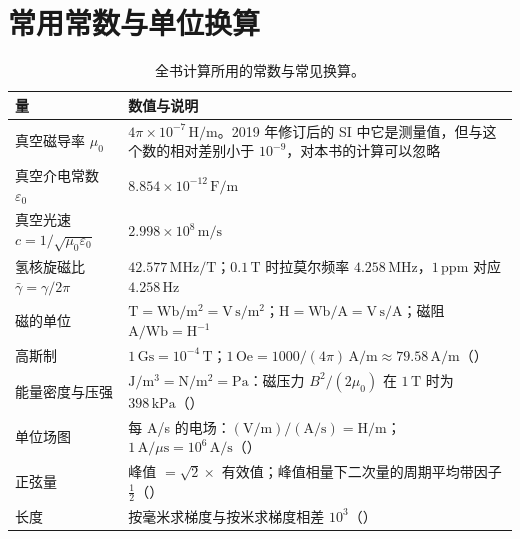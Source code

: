 \section{常用常数与单位换算}\label{sec:app-constants}

\begin{table}[H]\centering\small
\caption{全书计算所用的常数与常见换算。}\label{tab:app-constants}
\begin{tabularx}{\linewidth}{@{}>{\raggedright\arraybackslash}p{.36\linewidth} Y@{}}
\toprule
量 & 数值与说明\\\midrule
真空磁导率 $\mu_0$ & $4\pi\times10^{-7}\,\mathrm{H/m}$。2019 年修订后的 SI 中它是测量值，但与这个数的相对差别小于 $10^{-9}$，对本书的计算可以忽略\\
真空介电常数 $\varepsilon_0$ & $8.854\times10^{-12}\,\mathrm{F/m}$\\
真空光速 $c=1/\sqrt{\mu_0\varepsilon_0}$ & $2.998\times10^8\,\mathrm{m/s}$\\
氢核旋磁比 $\bar\gamma=\gamma/2\pi$ & $42.577\,\mathrm{MHz/T}$；$0.1\,\mathrm T$ 时拉莫尔频率 $4.258\,\mathrm{MHz}$，$1\,\mathrm{ppm}$ 对应 $4.258\,\mathrm{Hz}$\\
磁的单位 & $\mathrm T=\mathrm{Wb/m^2}=\mathrm{V\,s/m^2}$；$\mathrm H=\mathrm{Wb/A}=\mathrm{V\,s/A}$；磁阻 $\mathrm{A/Wb}=\mathrm H^{-1}$\\
高斯制 & $1\,\mathrm{Gs}=10^{-4}\,\mathrm T$；$1\,\mathrm{Oe}=1000/(4\pi)\,\mathrm{A/m}\approx79.58\,\mathrm{A/m}$（）\\
能量密度与压强 & $\mathrm{J/m^3}=\mathrm{N/m^2}=\mathrm{Pa}$：磁压力 $B^2/(2\mu_0)$ 在 $1\,\mathrm T$ 时为 $398\,\mathrm{kPa}$（）\\
单位场图 & 每 A/s 的电场：$(\mathrm{V/m})/(\mathrm{A/s})=\mathrm{H/m}$；$1\,\mathrm{A}/\mu\mathrm s=10^6\,\mathrm{A/s}$（）\\
正弦量 & 峰值 $=\sqrt2\times$ 有效值；峰值相量下二次量的周期平均带因子 $\tfrac12$（）\\
长度 & 按毫米求梯度与按米求梯度相差 $10^3$（）\\
\bottomrule
\end{tabularx}
\end{table}
